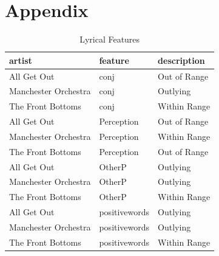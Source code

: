 \documentclass{article}\usepackage[]{graphicx}\usepackage[]{xcolor}
\begin{document}
\pagebreak
\section{Appendix}

\begin{table}[H]
\centering
\begingroup\small
\begin{tabular}{lll}
  \hline
artist & feature & description \\ 
  \hline
All Get Out & conj & Out of Range \\ 
  Manchester Orchestra & conj & Outlying \\ 
  The Front Bottoms & conj & Within Range \\ 
  All Get Out & Perception & Out of Range \\ 
  Manchester Orchestra & Perception & Within Range \\ 
  The Front Bottoms & Perception & Out of Range \\ 
  All Get Out & OtherP & Outlying \\ 
  Manchester Orchestra & OtherP & Outlying \\ 
  The Front Bottoms & OtherP & Within Range \\ 
  All Get Out & positivewords & Outlying \\ 
  Manchester Orchestra & positivewords & Outlying \\ 
  The Front Bottoms & positivewords & Within Range \\ 
   \hline
\end{tabular}
\endgroup
\caption{Lyrical Features} 
\end{table}
\end{document}
